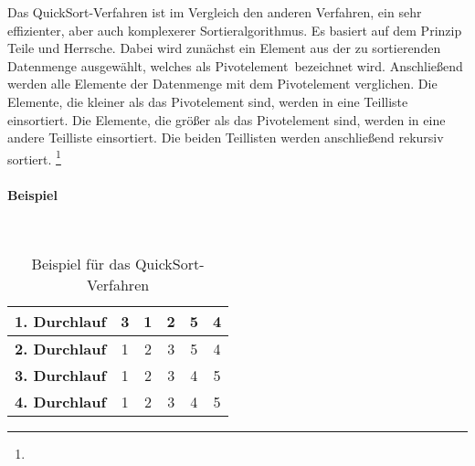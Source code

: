 \documentclass[../entry.tex]{subfiles}
\begin{document}
    Das \dq QuickSort\dq-Verfahren ist im Vergleich den anderen Verfahren, ein sehr effizienter,
    aber auch komplexerer Sortieralgorithmus.
    Es basiert auf dem Prinzip \dq Teile und Herrsche\dq.
    Dabei wird zunächst ein Element aus der zu sortierenden Datenmenge ausgewählt,
    welches als \dq Pivotelement\dq\ bezeichnet wird.
    Anschließend werden alle Elemente der Datenmenge mit dem Pivotelement verglichen.
    Die Elemente, die kleiner als das Pivotelement sind, werden in eine Teilliste einsortiert.
    Die Elemente, die größer als das Pivotelement sind, werden in eine andere Teilliste einsortiert.
    Die beiden Teillisten werden anschließend rekursiv sortiert.
    \footnote{}

    \paragraph{Beispiel} \mbox{}\\

    \begin{table}[h]
        \centering
        \begin{tabular}{|c|c|c|c|c|c|}
            \hline
            \textbf{1. Durchlauf} & 3 & 1 & {\color{red}2} & 5 & 4 \\
            \hline
            \textbf{2. Durchlauf} & 1 & {\color{red}2} & 3 & 5 & 4 \\
            \hline
            \textbf{3. Durchlauf} & 1 & 2 & 3 & {\color{red}4} & 5 \\
            \hline
            \textbf{4. Durchlauf} & 1 & 2 & 3 & 4 & 5 \\
            \hline
        \end{tabular}
        \caption{Beispiel für das \dq QuickSort\dq-Verfahren}
        \label{tab:quicksort}
    \end{table}
\end{document}
